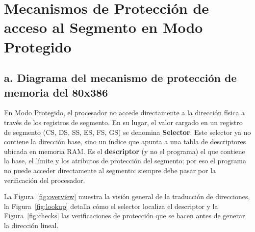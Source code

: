 \documentclass[RT]{UTNLSE}
\begin{document}
\section{Mecanismos de Protección de acceso al Segmento en Modo Protegido}

\subsection*{a. Diagrama del mecanismo de protección de memoria del 80x386}
En Modo Protegido, el procesador no accede directamente a la dirección física a través de los registros de segmento. En su lugar, el valor cargado en un registro de segmento (CS, DS, SS, ES, FS, GS) se denomina \textbf{Selector}. Este selector ya no contiene la dirección base, sino un índice que apunta a una tabla de descriptores ubicada en memoria RAM. Es el \textbf{descriptor} (y no el programa) el que contiene la base, el límite y los atributos de protección del segmento; por eso el programa no puede acceder directamente al segmento: siempre debe pasar por la verificación del procesador.

La Figura~\ref{fig:overview} muestra la visión general de la traducción de direcciones, la Figura~\ref{fig:lookup} detalla cómo el selector localiza el descriptor y la Figura~\ref{fig:checks} las verificaciones de protección que se hacen antes de generar la dirección lineal.
\end{document}

